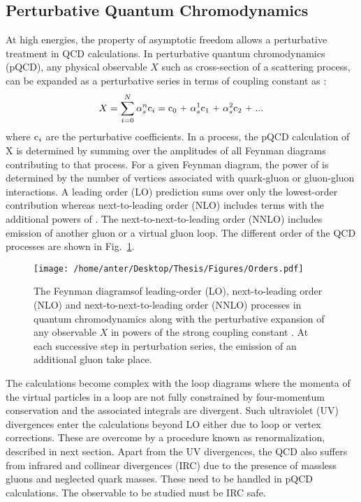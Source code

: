 \subsection{Perturbative Quantum Chromodynamics}
At high energies, the property of asymptotic freedom allows a perturbative treatment in QCD calculations. In perturbative quantum chromodynamics (pQCD), any physical observable $X$ such as cross-section of a scattering process, can be expanded as a perturbative series in terms of coupling constant \alps as : 
\begin{equation}
X = \sum\limits_{i=0}^{N} \alpha^n_s {\rm c}_i = {\rm c}_0~\plus \alpha^1_s {\rm c}_1~\plus \alpha^2_s {\rm c}_2~\plus ...
\end{equation} 
where ${\rm c}_i$ are the perturbative coefficients. In a process, the pQCD calculation of X is determined by summing over the amplitudes of all Feynman diagrams contributing to that process. For a given Feynman diagram, the power of \alps is determined by the number of vertices associated with quark-gluon or gluon-gluon interactions. A leading order (LO) prediction sums over only the lowest-order contribution whereas next-to-leading order (NLO) includes terms with the additional powers of \alps. The next-to-next-to-leading order (NNLO) includes emission of another gluon or a virtual gluon loop. The different order of the QCD processes are shown in Fig.~\ref{fig:orders}.
\begin{figure}[!h]
\begin{center}
\hspace*{-1mm}
\texttt{[image: /home/anter/Desktop/Thesis/Figures/Orders.pdf]}\\
\vspace*{4mm}
\caption[The Feynman diagrams of leading-order (LO), next-to-leading order (NLO) and next-to-next-to-leading order (NNLO) processes in quantum chromodynamics.]{The Feynman diagrams\footnotemark of leading-order (LO), next-to-leading order (NLO) and next-to-next-to-leading order (NNLO) processes in quantum chromodynamics along with the perturbative expansion of any observable $X$ in powers of the strong coupling constant \alps. At each successive step in perturbation series, the emission of an additional gluon take place.}
\label{fig:orders}
\end{center}
\end{figure}
The calculations become complex with the loop diagrams where the momenta of the virtual particles in a loop are not fully constrained by four-momentum conservation and the associated integrals are divergent. Such ultraviolet (UV) divergences enter the calculations beyond LO either due to loop or vertex corrections. These are overcome by a procedure known as renormalization, described in next section. Apart from the UV divergences, the QCD also suffers from infrared and collinear divergences (IRC) due to the presence of massless gluons and neglected quark masses. These need to be handled in pQCD calculations. The observable to be studied must be IRC safe. 

